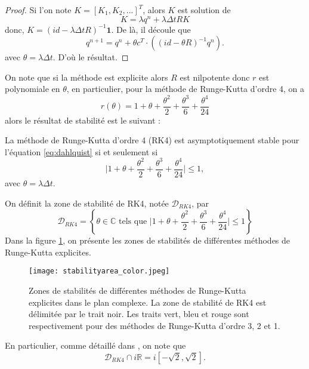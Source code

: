 \begin{proof}
Si l'on note $K = [K_1, K_2, ...]^T$, alors $K$ est solution de 
\begin{equation}
K = \lambda q^n +  \lambda \Delta t R K
\end{equation}
donc, $K = (id - \lambda \Delta t R)^{-1} \mathbf{1}$.
De là, il découle que 
\begin{equation}
q^{n+1} = q^n + \theta c^T \cdot \left( (id - \theta R)^{-1} q^n \right).
\end{equation} 
avec $\theta = \lambda \Delta t$. D'où le résultat.
\end{proof}
On note que si la méthode est explicite alors $R$ est nilpotente donc $r$ est polynomiale en $\theta$, 
en particulier, pour la méthode de Runge-Kutta d'ordre 4, on a 
\begin{equation}
r(\theta) = 1 + \theta + \dfrac{\theta^2}{2} + \dfrac{\theta^3}{6} + \dfrac{\theta^4}{24} 
\end{equation}
alors le résultat de stabilité est le suivant :
\begin{proposition}
La méthode de Runge-Kutta d'ordre 4 (RK4) est asymptotiquement stable pour l'équation \eqref{eq:dahlquist} si et seulement si
\begin{equation}
\vert 1 + \theta + \dfrac{\theta^2}{2} + \dfrac{\theta^3}{6} + \dfrac{\theta^4}{24}  \vert \leq 1,
\end{equation}
avec $\theta = \lambda \Delta t$.
\end{proposition}
On définit la zone de stabilité de RK4, notée $\mathcal{D}_{RK4}$, par
\begin{equation}
\mathcal{D}_{RK4} = \left\lbrace \theta \in \mathbb{C} \text{ tels que } \vert 1 + \theta + \dfrac{\theta^2}{2} + \dfrac{\theta^3}{6} + \dfrac{\theta^4}{24}  \vert \leq 1 \right\rbrace
\end{equation} 
Dans la figure \ref{fig:stab_area}, on présente les zones de stabilités de différentes méthodes de Runge-Kutta explicites.
\begin{figure}[htbp]
\begin{center}
\texttt{[image: stabilityarea\_color.jpeg]}
\end{center}
\caption{Zones de stabilités de différentes méthodes de Runge-Kutta explicites dans le plan complexe. La zone de stabilité de RK4 est délimitée par le trait noir. Les traits vert, bleu et rouge sont respectivement pour des méthodes de Runge-Kutta d'ordre 3, 2 et 1.}
\label{fig:stab_area}
\end{figure}
En particulier, comme détaillé dans \cite{Hundsdorfer2013}, on note que
\begin{equation}
\mathcal{D}_{RK4} \cap i \mathbb{R} = i \left[-\sqrt{2},\sqrt{2}\right].
\end{equation}





